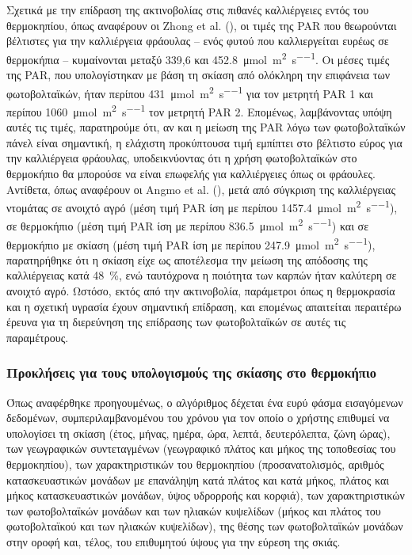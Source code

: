 \documentclass[12pt, a4paper]{report} %
\newcommand{\english}{\foreignlanguage{english}}
\begin{document}
Σχετικά με την επίδραση της ακτινοβολίας στις πιθανές καλλιέργειες εντός του θερμοκηπίου, όπως αναφέρουν οι \english{Zhong et al.} 
(\citeyear{alg_adv_bib8}), οι τιμές της \english{PAR} που θεωρούνται βέλτιστες για την καλλιέργεια φράουλας – ενός φυτού που 
καλλιεργείται ευρέως σε θερμοκήπια – κυμαίνονται μεταξύ 339,6 και \SI{452,8}{\micro\mol\per\meter\squared\per\second}. Οι μέσες 
τιμές της \english{PAR}, που υπολογίστηκαν με βάση τη σκίαση από ολόκληρη την επιφάνεια των φωτοβολταϊκών, ήταν περίπου 
\SI{431}{\micro\mol\per\meter\squared\per\second} για τον μετρητή \english{PAR} 1 και περίπου \SI{1060}{\micro\mol\per\meter\squared\per\second} 
τον μετρητή \english{PAR} 2. Επομένως, λαμβάνοντας υπόψη αυτές τις τιμές, παρατηρούμε ότι, αν και η μείωση της \english{PAR} 
λόγω των φωτοβολταϊκών πάνελ είναι σημαντική, η ελάχιστη προκύπτουσα τιμή εμπίπτει στο βέλτιστο εύρος για την καλλιέργεια 
φράουλας, υποδεικνύοντας ότι η χρήση φωτοβολταϊκών στο θερμοκήπιο θα μπορούσε να είναι επωφελής για καλλιέργειες όπως οι 
φράουλες. Αντίθετα, όπως αναφέρουν οι \english{Angmo et al.} (\citeyear{eisagwgi_alg_bib14}), μετά από σύγκριση της καλλιέργειας 
ντομάτας σε ανοιχτό αγρό (μέση τιμή \english{PAR} ίση με περίπου \SI{1457,4}{\micro\mol\per\meter\squared\per\second}), 
σε θερμοκήπιο (μέση τιμή \english{PAR} ίση με περίπου \SI{836,5}{\micro\mol\per\meter\squared\per\second}) και σε θερμοκήπιο 
με σκίαση (μέση τιμή \english{PAR} ίση με περίπου \SI{247,9}{\micro\mol\per\meter\squared\per\second}), παρατηρήθηκε ότι η 
σκίαση είχε ως αποτέλεσμα την μείωση της απόδοσης της καλλιέργειας κατά \SI{48}{\percent}, ενώ ταυτόχρονα η ποιότητα των 
καρπών ήταν καλύτερη σε ανοιχτό αγρό. Ωστόσο, εκτός από την ακτινοβολία, παράμετροι όπως η θερμοκρασία και η σχετική υγρασία 
έχουν σημαντική επίδραση, και επομένως απαιτείται περαιτέρω έρευνα για τη διερεύνηση της επίδρασης των φωτοβολταϊκών σε αυτές 
τις παραμέτρους.

\subsubsection{Προκλήσεις για τους υπολογισμούς της σκίασης στο θερμοκήπιο}\label{sub_alg_advanc_challenges}

Όπως αναφέρθηκε προηγουμένως, ο αλγόριθμος δέχεται ένα ευρύ φάσμα εισαγόμενων δεδομένων, συμπεριλαμβανομένου του χρόνου 
για τον οποίο ο χρήστης επιθυμεί να υπολογίσει τη σκίαση (έτος, μήνας, ημέρα, ώρα, λεπτά, δευτερόλεπτα, ζώνη ώρας), 
των γεωγραφικών συντεταγμένων (γεωγραφικό πλάτος και μήκος της τοποθεσίας του θερμοκηπίου), των χαρακτηριστικών του 
θερμοκηπίου (προσανατολισμός, αριθμός κατασκευαστικών μονάδων με επανάληψη κατά πλάτος και κατά μήκος, πλάτος και μήκος 
κατασκευαστικών μονάδων, ύψος υδρορροής και κορφιά), των χαρακτηριστικών των φωτοβολταϊκών μονάδων και των ηλιακών κυψελίδων 
(μήκος και πλάτος του φωτοβολταϊκού και των ηλιακών κυψελίδων), της θέσης των φωτοβολταϊκών μονάδων στην οροφή και, τέλος, 
του επιθυμητού ύψους για την εύρεση της σκιάς.
\end{document}
